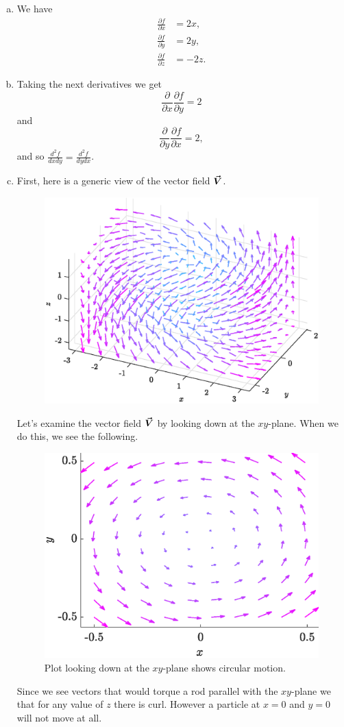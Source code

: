 \documentclass[12pt]{article} %
\begin{document}
\begin{solution}
\begin{enumerate}[(a)]
    \item We have
    \begin{align*}
        \frac{\partial f}{\partial x} &= 2x, \\
        \frac{\partial f}{\partial y} &= 2y, \\
        \frac{\partial f}{\partial z} &= -2z.
    \end{align*}
    \item Taking the next derivatives we get
    \[
        \frac{\partial }{\partial x} \frac{\partial f}{\partial y} = 2
    \]
    and
    \[
        \frac{\partial}{\partial y}\frac{\partial f}{\partial x} = 2,
    \]
    and so $\frac{d^2 f}{d x d y} = \frac{d^2 f}{d y d x}$.

    \item First, here is a generic view of the vector field $\boldsymbol{\vec{V}}$.
        \begin{figure}[H]
        \centering
        \includegraphics[width=.65\textwidth]{figures/6c_field}
    \end{figure}
        Let's examine the vector field $\boldsymbol{\vec{V}}$ by looking down at the $xy$-plane. When we do this, we see the following.
        \begin{figure}[H]
        \centering
        \includegraphics[width=.65\textwidth]{figures/6c}
        \caption{Plot looking down at the $xy$-plane shows circular motion.}
    \end{figure}
    Since we see vectors that would torque a rod parallel with the $xy$-plane we that for any value of $z$ there is curl. However a particle at $x=0$ and $y=0$ will not move at all.


\end{enumerate}
\end{solution}
\end{document}
